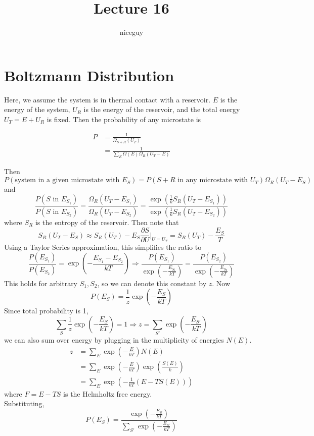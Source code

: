 \documentclass[12pt]{article}
\author{niceguy}
\title{Lecture 16}
\begin{document}
\maketitle

\section{Boltzmann Distribution}

Here, we assume the system is in thermal contact with a reservoir. $E$ is the energy of the system, $U_R$ is the energy of the reservoir, and the total energy $U_T = E + U_R$ is fixed. Then the probability of any microstate is

\begin{align*}
    P &= \frac{1}{\Omega_{S+R}(U_T)} \\
      &= \frac{1}{\sum_E \Omega(E)\Omega_R(U_T-E)}
\end{align*}

Then
$$P(\text{system in a given microstate with }E_S) = P(S+R\text{ in any microstate with }U_T) \Omega_R(U_T-E_S)$$
and
$$\frac{P(S\text{ in }E_{S_1})}{P(S\text{ in }E_{S_2})} = \frac{\Omega_R(U_T-E_{S_1})}{\Omega_R(U_T-E_{S_2})} = \frac{\exp\left(\frac{1}{k}S_R(U_T-E_{S_1})\right)}{\exp\left(\frac{1}{k}S_R(U_T-E_{S_2})\right)}$$
where $S_R$ is the entropy of the reservoir. Then note that
$$S_R(U_T-E_S) \approx S_R(U_T) - E_S\frac{\partial S}{\partial U} \Big |_{U=U_T} = S_R(U_T) - \frac{E_S}{T}$$
Using a Taylor Series approximation, this simplifies the ratio to
$$\frac{P(E_{S_1})}{P(E_{S_2})} = \exp\left(-\frac{E_{S_1}-E_{S_2}}{kT}\right) \Rightarrow \frac{P(E_{S_1})}{\exp\left(-\frac{E_{S_1}}{kT}\right)} = \frac{P(E_{S_2})}{\exp\left(-\frac{E_{S_2}}{kT}\right)}$$
This holds for arbitrary $S_1,S_2$, so we can denote this constant by $z$. Now
$$P(E_S) = \frac{1}{z} \exp\left(-\frac{E_S}{kT}\right)$$
Since total probability is 1,
$$\sum_S \frac{1}{z} \exp\left(-\frac{E_S}{kT}\right) = 1 \Rightarrow z = \sum_{S'} \exp\left(-\frac{E_{S'}}{kT}\right)$$
we can also sum over energy by plugging in the multiplicity of energies $N(E)$.
\begin{align*}
    z &= \sum_E \exp\left(-\frac{E}{kT}\right)N(E) \\
      &= \sum_E \exp\left(-\frac{E}{kT}\right) \exp\left(\frac{S(E)}{k}\right) \\
      &= \sum_E \exp\left(-\frac{1}{kT}(E-TS(E))\right)
\end{align*}
where $F=E-TS$ is the Helmholtz free energy. \\
Substituting,
$$P(E_S) = \frac{\exp\left(-\frac{E_S}{kT}\right)}{\sum_{S'} \exp\left(-\frac{E_{S'}}{kT}\right)}$$
\end{document}
